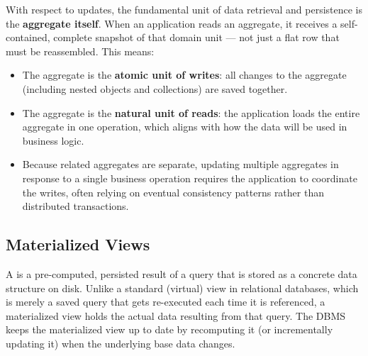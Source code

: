 With respect to updates, the fundamental unit of data retrieval and persistence is the \textbf{aggregate itself}. When an application reads an aggregate, it receives a self-contained, complete snapshot of that domain unit --- not just a flat row that must be reassembled. This means:
\begin{itemize}
    \item The aggregate is the \textbf{atomic unit of writes}: all changes to the aggregate (including nested objects and collections) are saved together.
    \item The aggregate is the \textbf{natural unit of reads}: the application loads the entire aggregate in one operation, which aligns with how the data will be used in business logic.
    \item Because related aggregates are separate, updating multiple aggregates in response to a single business operation requires the application to coordinate the writes, often relying on eventual consistency patterns rather than distributed transactions.
\end{itemize}

\subsection{Materialized Views}
A  is a pre-computed, persisted result of a query that is stored as a concrete data structure on disk. Unlike a standard (virtual) view in relational databases, which is merely a saved query that gets re-executed each time it is referenced, a materialized view holds the actual data resulting from that query. The DBMS keeps the materialized view up to date by recomputing it (or incrementally updating it) when the underlying base data changes.

